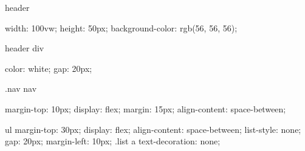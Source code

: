                                         header {
                                            width: 100vw;
                                            height: 50px;
                                            background-color: rgb(56, 56, 56);
                                            
                                        }
                                        header div{
                                            color: white;
                                            gap: 20px;
                                            
                                        
                                        }
                                        .nav nav{
                                            margin-top: 10px;
                                            display: flex;
                                            margin: 15px;
                                            align-content: space-between;
                                            
                                        }
                                        
                                        ul{
                                            margin-top: 30px;
                                            display: flex;
                                            align-content: space-between;
                                            list-style: none;
                                            gap: 20px;
                                            margin-left: 10px;
                                        }
                                        .list a{
                                            text-decoration: none;
                                        }
                                        
